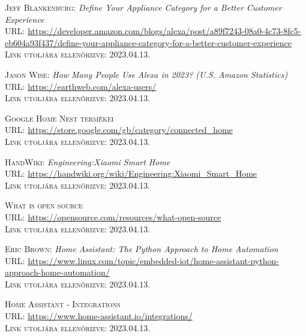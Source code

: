 \documentclass[
]{thesis-ekf}
\theoremstyle{definition}
\theoremstyle{remark}
\begin{document}
	
	\begin{thebibliography}{46}
		
		\textsc{Jeff Blankenburg}: \emph{Define Your Appliance Category for a Better Customer Experience}\\
		\textsc{URL:}%
		 \url{https://developer.amazon.com/blogs/alexa/post/a89f7243-08a0-4c73-8fc5-eb604a93f437/define-your-appliance-category-for-a-better-customer-experience}\\
		\textsc{Link utoljára ellenőrizve:} 2023.04.13.
		
		\textsc{Jason Wise}: \emph{How Many People Use Alexa in 2023? (U.S. Amazon Statistics)} \\
		\textsc{URL:} \url{https://earthweb.com/alexa-users/}\\
		\textsc{Link utoljára ellenőrizve:} 2023.04.13.
		
		\textsc{Google Home Nest termékei}\\
		\textsc{URL:} \url{https://store.google.com/gb/category/connected_home}\\
		\textsc{Link utoljára ellenőrizve:} 2023.04.13.
		
		\textsc{HandWiki}: \emph{Engineering:Xiaomi Smart Home}\\
		\textsc{URL:} \url{https://handwiki.org/wiki/Engineering:Xiaomi_Smart_Home}\\
		\textsc{Link utoljára ellenőrizve:} 2023.04.13.
		
		\textsc{What is open source}\\
		\textsc{URL:} \url{https://opensource.com/resources/what-open-source}\\
		\textsc{Link utoljára ellenőrizve:} 2023.04.13.
		
		\textsc{Eric Brown}: \emph{Home Assistant: The Python Approach to Home Automation}\\
		\textsc{URL:} \url{https://www.linux.com/topic/embedded-iot/home-assistant-python-approach-home-automation/}\\
		\textsc{Link utoljára ellenőrizve:} 2023.04.13.
		
		\textsc{Home Assistant - Integrations}\\
		\textsc{URL:} \url{https://www.home-assistant.io/integrations/}\\
		\textsc{Link utoljára ellenőrizve:} 2023.04.13.
		

\end{thebibliography}
\end{document}
